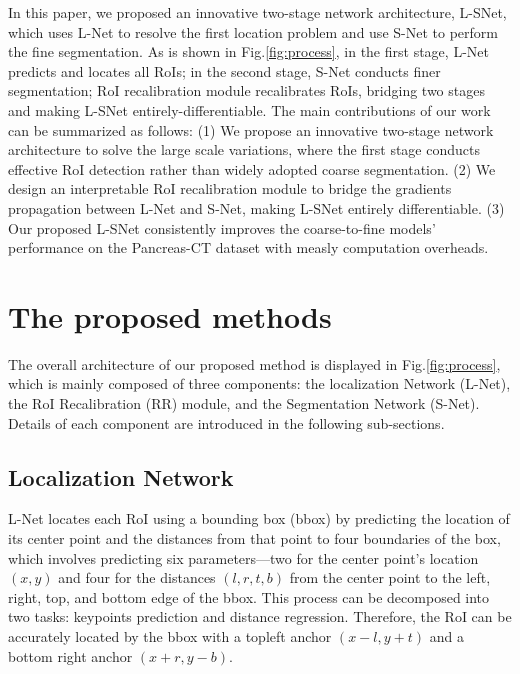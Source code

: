 \documentclass{article}
\begin{document}
In this paper, we proposed an innovative two-stage network architecture, L-SNet, which uses L-Net to resolve the first location problem and use S-Net to perform the fine segmentation. As is shown in Fig.\ref{fig:process}, in the first stage, L-Net predicts and locates all RoIs; in the second stage, S-Net conducts finer segmentation; RoI recalibration module recalibrates RoIs, bridging two stages and making L-SNet entirely-differentiable. 
The main contributions of our work can be summarized as follows:
(1) We propose an innovative two-stage network architecture to solve the large scale variations, where the first stage conducts effective RoI detection rather than widely adopted coarse segmentation.
(2) We design an interpretable RoI recalibration module to bridge the gradients propagation between L-Net and S-Net, making L-SNet entirely differentiable. 
(3) Our proposed L-SNet consistently improves the coarse-to-fine models' performance on the Pancreas-CT dataset with measly computation overheads.

\vspace{-15pt}
\section{The proposed methods}
\label{sec:the proposed methods}
\vspace{-10pt}
The overall architecture of our proposed method is displayed in Fig.\ref{fig:process}, which is mainly composed of three components: the localization Network (L-Net), the RoI Recalibration (RR) module, and the Segmentation Network (S-Net). 
Details of each component are introduced in the following sub-sections. \par

\vspace{-10pt}
\subsection{Localization Network}
\vspace{-5pt}

L-Net locates each RoI using a bounding box (bbox) by predicting the location of its center point and the distances from that point to four boundaries of the box, which involves predicting six parameters---two for the center point's location $(x,y)$ and four for the distances $(l,r,t,b)$ from the center point to the left, right, top, and bottom edge of the bbox. This process can be decomposed into two tasks: keypoints prediction and distance regression. Therefore, the RoI can be accurately located by the bbox with a topleft anchor $(x-l,y+t)$ and a bottom right anchor $(x+r,y-b)$. \par
\end{document}
